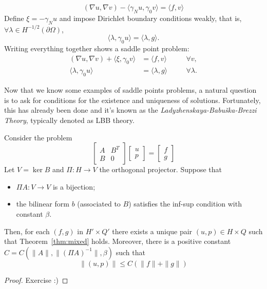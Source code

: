 \begin{itemize}
\begin{equation}
        (\nabla u, \nabla v) - \langle \gamma_N u, \gamma_0 v \rangle = \langle f,v \rangle
    \end{equation}
    Define $\xi = -\gamma_N u$ and impose Dirichlet boundary conditions weakly, that is, $\forall \lambda \in H^{-1/2}(\partial\Omega)$,
    \begin{equation}
         \langle \lambda, \gamma_0 u \rangle = \langle \lambda, g \rangle.
    \end{equation}
    Writing everything together shows a saddle point problem:
    \begin{equation}
        \begin{aligned}
            (\nabla u, \nabla v) + \langle \xi, \gamma_0 v \rangle &= \langle f,v \rangle &&\quad \forall v,\\ 
            \langle \lambda, \gamma_0 u \rangle &= \langle \lambda, g \rangle &&\quad  \forall \lambda.
        \end{aligned}
    \end{equation}
\end{itemize}

Now that we know some examples of saddle points problems, a natural question is to ask for conditions for the existence and uniqueness of solutions. Fortunately, this has already been done and it's known as the \emph{Ladyzhenskaya-Babu\v{s}ka-Brezzi Theory}, typically denoted as LBB theory.
\begin{theorem}\label{thm:mixed}
    Consider the problem
    \begin{equation*}
        \begin{bmatrix}
            A & B^{T}\\ 
            B & 0
        \end{bmatrix}
        \begin{bmatrix}
            u \\ p
        \end{bmatrix}
        =
        \begin{bmatrix}
            f \\ g
        \end{bmatrix}
    \end{equation*}
    Let $V = \ker B$ and $\Pi\colon H\to V$ the orthogonal projector. Suppose that
    \begin{itemize}
        \item $\Pi A\colon V\to V$ is a bijection;
        \item the bilinear form $b$ (associated to $B$) satisfies the inf-sup condition with constant $\beta$.
    \end{itemize}
    Then, for each $(f,g)$ in $H'\times Q'$ there exists a unique pair $(u,p)\in H\times Q$ such that Theorem~\ref{thm:mixed} holds. Moreover, there is a positive constant $C=C(\|A\|, \| (\Pi A)^{-1}\|, \beta)$ such that
    \begin{equation*}
        \| (u,p) \| \le C \left( \|f\| + \|g\| \right) 
    \end{equation*}
    \begin{proof}
        Exercise :)
    \end{proof}
\end{theorem}

